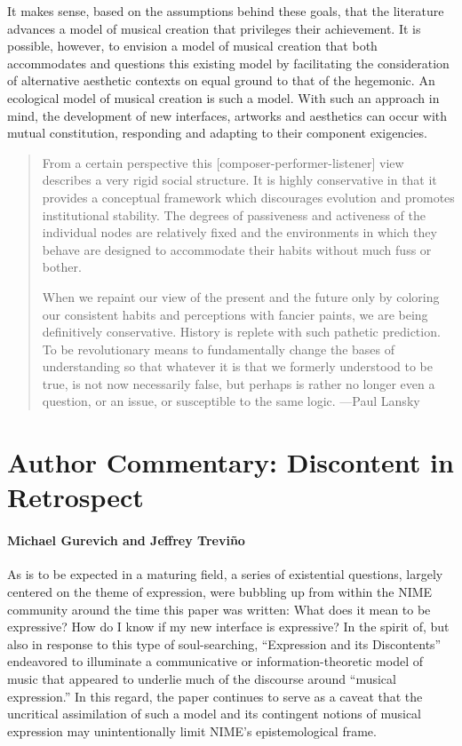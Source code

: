 It makes sense, based on the assumptions behind these goals, that the literature advances a model of musical creation that privileges their achievement. It is possible, however, to envision a model of musical creation that both accommodates and questions this existing model by facilitating the consideration of alternative aesthetic contexts on equal ground to that of the hegemonic. An ecological model of musical creation is such a model. With such an approach in mind, the development of new interfaces, artworks and aesthetics can occur with mutual constitution, responding and adapting to their component exigencies.

\begin{quotation}
From a certain perspective this [composer-performer-listener] view describes a very rigid social structure. It is highly conservative in that it provides a conceptual framework which discourages evolution and promotes institutional stability. The degrees of passiveness and activeness of the individual nodes are relatively fixed and the environments in which they behave are designed to accommodate their habits without much fuss or bother.

When we repaint our view of the present and the future only by coloring our consistent habits and perceptions with fancier paints, we are being definitively conservative. History is replete with such pathetic prediction. To be revolutionary means to fundamentally change the bases of understanding so that whatever it is that we formerly understood to be true, is not now necessarily false, but perhaps is rather no longer even a question, or an issue, or susceptible to the same logic. ---Paul Lansky \cite{Lansky:1990}
\end{quotation}


\section*{Author Commentary: Discontent in Retrospect}
\paragraph{Michael Gurevich and Jeffrey Trevi\~{n}o}

As is to be expected in a maturing field, a series of existential questions, largely centered on the theme of expression, were bubbling up from within the NIME community around the time this paper was written: What does it mean to be expressive? How do I know if my new interface is expressive? In the spirit of, but also in response to this type of soul-searching, ``Expression and its Discontents'' endeavored to illuminate a communicative or information-theoretic model of music that appeared to underlie much of the discourse around ``musical expression.'' In this regard, the paper continues to serve as a caveat that the uncritical assimilation of such a model and its contingent notions of musical expression may unintentionally limit NIME's epistemological frame. 

